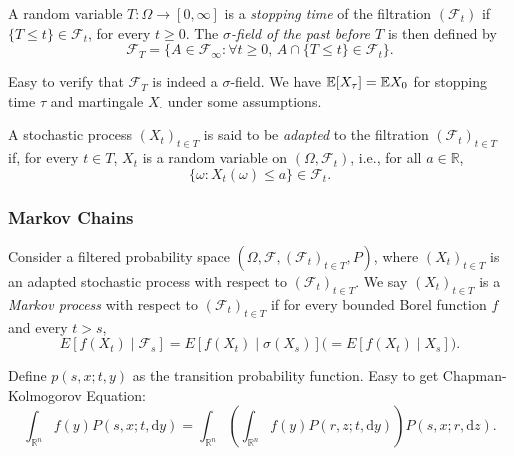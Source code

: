 \begin{defn}
A random variable $T : \Omega \longrightarrow [0, \infty]$ is a \textit{stopping time} of the filtration $(\mathcal{F}_t)$ if $\{T \leq t\} \in \mathcal{F}_t$, for every $t \geq 0$. The \textit{$\sigma$-field of the past before $T$} is then defined by
\[
\mathcal{F}_T = \{A \in \mathcal{F}_\infty : \forall t \geq 0, \, A \cap \{T \leq t\} \in \mathcal{F}_t\}.
\]
\end{defn}

\begin{rem}
    Easy to verify that $\mathcal{F}_T$ is indeed a $\sigma$-field. We have $\mathbb{E} [X_\tau] = \mathbb{E} X_0$ for stopping time $\tau$ and martingale $X_{\cdot}$ under some assumptions. 
\end{rem}

\begin{defn}[Adaptedness]
A stochastic process $(X_t)_{t \in T}$ is said to be \textit{adapted} to the filtration $(\mathcal{F}_t)_{t \in T}$ if, for every $t \in T$, $X_t$ is a random variable on $(\Omega, \mathcal{F}_t)$, i.e., for all $a \in \mathbb{R}$,
\[
\{\omega : X_t(\omega) \leq a\} \in \mathcal{F}_t.
\]
\end{defn}

\subsubsection{Markov Chains}
\begin{defn}
Consider a filtered probability space $(\Omega, \mathcal{F}, (\mathcal{F}_t)_{t \in T}, P)$, where $(X_t)_{t \in T}$ is an adapted stochastic process with respect to $(\mathcal{F}_t)_{t \in T}$. We say $(X_t)_{t \in T}$ is a \textit{Markov process} with respect to $(\mathcal{F}_t)_{t \in T}$ if for every bounded Borel function $f$ and every $t > s$,
\[
E[f(X_t) \mid \mathcal{F}_s] = E[f(X_t) \mid \sigma(X_s)] \Big(= E[f(X_t) \mid X_s]\Big).
\]
\end{defn}

\begin{rem}
    Define $p(s,x;t,y)$ as the transition probability function. Easy to get Chapman-Kolmogorov Equation:
    \[
    \int_{\mathbb{R}^n} f(y) P(s, x; t, \mathrm{d}y) = \int_{\mathbb{R}^n} \left( \int_{\mathbb{R}^n} f(y) P(r, z; t, \mathrm{d}y) \right) P(s, x; r, \mathrm{d}z).
    \]
\end{rem}

